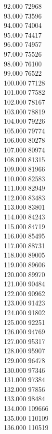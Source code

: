 { 92.000	72968 \\
 93.000	73596 \\
 94.000	74004 \\
 95.000	74417 \\
 96.000	74957 \\
 97.000	75526 \\
 98.000	76100 \\
 99.000	76522 \\
 100.000	77128 \\
 101.000	77582 \\
 102.000	78167 \\
 103.000	78819 \\
 104.000	79226 \\
 105.000	79774 \\
 106.000	80278 \\
 107.000	80974 \\
 108.000	81315 \\
 109.000	81966 \\
 110.000	82583 \\
 111.000	82949 \\
 112.000	83483 \\
 113.000	83801 \\
 114.000	84243 \\
 115.000	84719 \\
 116.000	85495 \\
 117.000	88731 \\
 118.000	89005 \\
 119.000	89606 \\
 120.000	89970 \\
 121.000	90484 \\
 122.000	90962 \\
 123.000	91423 \\
 124.000	91802 \\
 125.000	92251 \\
 126.000	94769 \\
 127.000	95317 \\
 128.000	95907 \\
 129.000	96478 \\
 130.000	97346 \\
 131.000	97384 \\
 132.000	97856 \\
 133.000	98484 \\
 134.000	109666 \\
 135.000	110109 \\
 136.000	110519 \\
}

